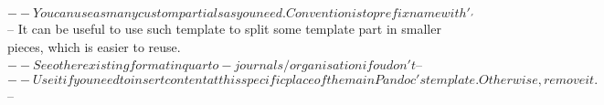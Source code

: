 $-- You can use as many custom partials as you need. Convention is to prefix name with '_'
$-- It can be useful to use such template to split some template part in smaller pieces, which is easier to reuse. 
$-- See other existing format in quarto-journals/ organisation if ou don't 
$-- %
$-- Use it if you need to insert content at this specific place of the main Pandoc's template. Otherwise, remove it.
$-- %